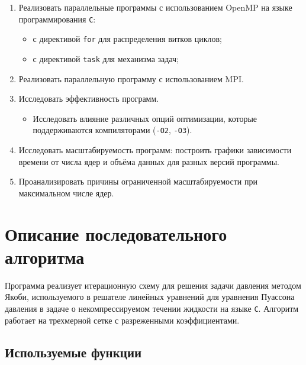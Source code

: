 \documentclass[a4paper, 11pt]{article}
\begin{document}
\begin{enumerate}
    \item Реализовать параллельные программы с использованием OpenMP на языке программирования \texttt{C}:
    \begin{itemize}
        \item с директивой \texttt{for} для распределения витков циклов;
        \item с директивой \texttt{task} для механизма задач;
    \end{itemize}
    \item Реализовать параллельную программу с использованием MPI.
    \item Исследовать эффективность программ.
    \begin{itemize}
        \item Исследовать влияние различных опций оптимизации, которые поддерживаются компиляторами (\texttt{-O2}, \texttt{-O3}). 
    \end{itemize}
    \item Исследовать масштабируемость программ: построить графики зависимости времени от числа ядер и объёма данных для разных версий программы.
    \item Проанализировать причины ограниченной масштабируемости при максимальном числе ядер.
\end{enumerate}

\newpage

\section*{Описание последовательного алгоритма}

Программа реализует итерационную схему для решения задачи давления методом Якоби, используемого в решателе линейных уравнений для уравнения Пуассона давления в задаче о некомпрессируемом течении жидкости на языке \texttt{C}. Алгоритм работает на трехмерной сетке с разреженными коэффициентами.

\subsection*{Используемые функции}
\end{document}
